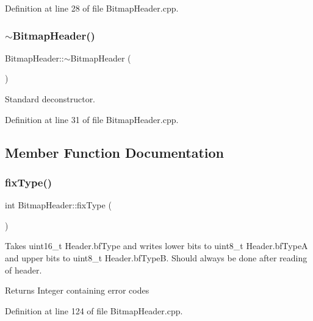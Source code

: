 Definition at line 28 of file Bitmap\+Header.\+cpp.

\mbox{\label{classBitmapHeader_a4e102d5fe9a8619fca7319b148ec23d1}} 
\subsubsection{\texorpdfstring{$\sim$BitmapHeader()}{~BitmapHeader()}}
{\footnotesize\ttfamily Bitmap\+Header\+::$\sim$\+Bitmap\+Header (\begin{DoxyParamCaption}{ }\end{DoxyParamCaption})\hspace{0.3cm}{\ttfamily [virtual]}}

Standard deconstructor. 

Definition at line 31 of file Bitmap\+Header.\+cpp.



\subsection{Member Function Documentation}
\mbox{\label{classBitmapHeader_aa02e59db95074c6a96a44dac03cee77b}} 
\subsubsection{\texorpdfstring{fixType()}{fixType()}}
{\footnotesize\ttfamily int Bitmap\+Header\+::fix\+Type (\begin{DoxyParamCaption}{ }\end{DoxyParamCaption})}



Takes uint16\+\_\+t Header.\+bf\+Type and writes lower bits to uint8\+\_\+t Header.\+bf\+TypeA and upper bits to uint8\+\_\+t Header.\+bf\+TypeB. Should always be done after reading of header. 

\begin{DoxyReturn}{Returns}
Integer containing error codes 
\end{DoxyReturn}


Definition at line 124 of file Bitmap\+Header.\+cpp.

